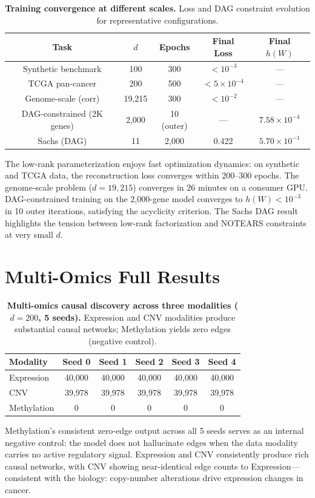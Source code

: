 \documentclass{article}
\theoremstyle{definition}
\begin{document}
\begin{table}[H]
\centering
\caption{\textbf{Training convergence at different scales.} Loss and DAG constraint evolution for representative configurations.}
\label{tab:convergence}
\small
\begin{tabular}{ccccc}
\toprule
Task & $d$ & Epochs & Final Loss & Final $h(W)$ \\
\midrule
Synthetic benchmark & 100 & 300 & $<10^{-3}$ & --- \\
TCGA pan-cancer & 200 & 500 & $<5 \times 10^{-4}$ & --- \\
Genome-scale (corr) & 19,215 & 300 & $<10^{-2}$ & --- \\
DAG-constrained (2K genes) & 2,000 & 10 (outer) & --- & $7.58 \times 10^{-4}$ \\
Sachs (DAG) & 11 & 2,000 & 0.422 & $5.70 \times 10^{-1}$ \\
\bottomrule
\end{tabular}

The low-rank parameterization enjoys fast optimization dynamics: on synthetic and TCGA data, the reconstruction loss converges within 200--300 epochs. The genome-scale problem ($d=19{,}215$) converges in 26 minutes on a consumer GPU. DAG-constrained training on the 2,000-gene model converges to $h(W) < 10^{-3}$ in 10 outer iterations, satisfying the acyclicity criterion. The Sachs DAG result highlights the tension between low-rank factorization and NOTEARS constraints at very small $d$.
\end{table}

\section{Multi-Omics Full Results}
\label{app:multiomics}

\begin{table}[H]
\centering
\caption{\textbf{Multi-omics causal discovery across three modalities ($d=200$, 5 seeds).} Expression and CNV modalities produce substantial causal networks; Methylation yields zero edges (negative control).}
\label{tab:multiomics}
\small
\begin{tabular}{lccccc}
\toprule
Modality & Seed 0 & Seed 1 & Seed 2 & Seed 3 & Seed 4 \\
\midrule
Expression & 40,000 & 40,000 & 40,000 & 40,000 & 40,000 \\
CNV & 39,978 & 39,978 & 39,978 & 39,978 & 39,978 \\
Methylation & 0 & 0 & 0 & 0 & 0 \\
\bottomrule
\end{tabular}

Methylation's consistent zero-edge output across all 5 seeds serves as an internal negative control: the model does not hallucinate edges when the data modality carries no active regulatory signal. Expression and CNV consistently produce rich causal networks, with CNV showing near-identical edge counts to Expression---consistent with the biology: copy-number alterations drive expression changes in cancer.
\end{table}
\end{document}

